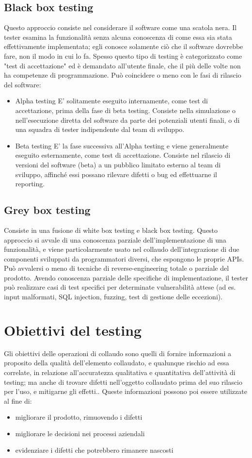 \subsection{Black box testing}
Questo approccio consiste nel considerare il software come una scatola nera.
Il tester esamina la funzionalità senza alcuna conoscenza di come essa sia stata effettivamente implementata; egli conosce solamente ciò che il software dovrebbe fare, non il modo in cui lo fa.
Spesso questo tipo di testing è categorizzato come "test di accettazione" ed è demandato all'utente finale, che il più delle volte non ha competenze di programmazione.
Può coincidere o meno con le fasi di rilascio del software:
\begin{itemize}
\item Alpha testing
E' solitamente eseguito internamente, come test di accettazione, prima della fase di beta testing.
Consiste nella simulazione o nell'esecuzione diretta del software da parte dei potenziali utenti finali, o di una squadra di tester indipendente dal team di sviluppo.
\item Beta testing
E' la fase successiva all'Alpha testing e viene generalmente eseguito esternamente, come test di accettazione.
Consiste nel rilascio di versioni del software (beta) a un pubblico limitato esterno al team di sviluppo, affinché essi possano rilevare difetti o bug ed effettuarne il reporting.
\end{itemize}
\subsection{Grey box testing}
Consiste in una fusione di white box testing e black box testing.
Questo approccio si avvale di una conoscenza parziale dell'implementazione di una funzionalità, e viene particolarmente usato nel collaudo dell'integrazione di due componenti sviluppati da programmatori diversi, che espongono le proprie APIs.
Può avvalersi o meno di tecniche di reverse-engineering totale o parziale del prodotto.
Avendo conoscenza parziale delle specifiche di implementazione, il tester può realizzare casi di test specifici per determinate vulnerabilità attese (ad es. input malformati, SQL injection, fuzzing, test di gestione delle eccezioni).
\section{Obiettivi del testing}
Gli obiettivi delle operazioni di collaudo sono quelli di fornire informazioni a proposito della qualità dell'elemento collaudato, e qualunque rischio ad essa correlate, in relazione all'accuratezza qualitativa e quantitativa dell'attività di testing; ma anche di trovare difetti nell'oggetto collaudato prima del suo rilascio per l'uso, e mitigarne gli effetti.\cite{iso29119}.
Queste informazioni possono poi essere utilizzate al fine di:
\begin{itemize}
\item migliorare il prodotto, rimuovendo i difetti
\item migliorare le decisioni nei processi aziendali
\item evidenziare i difetti che potrebbero rimanere nascosti
\end{itemize}
